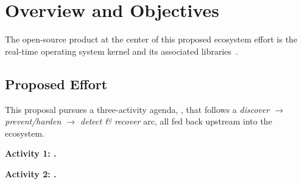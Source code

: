 \section{Overview and Objectives}


The open-source product at the center of this proposed ecosystem effort is the \ose{} real-time operating system kernel and its associated libraries~\cite{freertos}.

\subsection{Proposed Effort}

This proposal pursues a three-activity agenda, \sysname, that follows a \emph{discover $\rightarrow$ prevent/harden $\rightarrow$ detect \& recover} arc, all fed back upstream into the \ose{} ecosystem.

\noindent\textbf{Activity 1: \actone.}

\noindent\textbf{Activity 2: \acttwo.}

